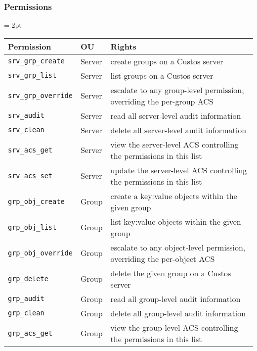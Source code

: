 \subsubsection{Permissions}
\label{chap:custos:arch:ac:perms}

\begin{table}[t]
  \centering
  \tabulinesep = 2pt
  \begin{tabu} to \textwidth
    { | X[1.25,l,m]
      | X[.5,l,m]
      | X[4,l,m]
      | }
    \hline
    \textbf{Permission}
    & \textbf{OU}
    & \textbf{Rights}
    \\ \hline
    \texttt{srv\_grp\_create}
    & Server
    & create groups on a Custos server
    \\ \hline
    \texttt{srv\_grp\_list}
    & Server
    & list groups on a Custos server
    \\ \hline
    \texttt{srv\_grp\_override}
    & Server
    & escalate to any group-level permission, overriding the per-group ACS
    \\ \hline
    \texttt{srv\_audit}
    & Server
    & read all server-level audit information
    \\ \hline
    \texttt{srv\_clean}
    & Server
    & delete all server-level audit information
    \\ \hline
    \texttt{srv\_acs\_get}
    & Server
    & view the server-level ACS controlling the permissions in this list
    \\ \hline
    \texttt{srv\_acs\_set}
    & Server
    & update the server-level ACS controlling the permissions in this list
    \\ \hline
    \texttt{grp\_obj\_create}
    & Group
    & create a key:value objects within the given group
    \\ \hline
    \texttt{grp\_obj\_list}
    & Group
    & list key:value objects within the given group
    \\ \hline
    \texttt{grp\_obj\_override}
    & Group
    & escalate to any object-level permission, overriding the per-object ACS
    \\ \hline
    \texttt{grp\_delete}
    & Group
    & delete the given group on a Custos server
    \\ \hline
    \texttt{grp\_audit}
    & Group
    & read all group-level audit information
    \\ \hline
    \texttt{grp\_clean}
    & Group
    & delete all group-level audit information
    \\ \hline
    \texttt{grp\_acs\_get}
    & Group
    & view the group-level ACS controlling the permissions in this list

\end{tabu}
\end{table}
